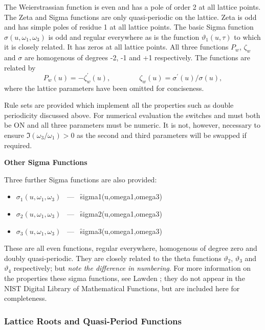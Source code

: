 The Weierstrassian function is even and has a pole of order 2 at all lattice points.
The Zeta and Sigma functions are only quasi-periodic on the lattice. Zeta is odd and has simple poles of residue
1 at all lattice points. The basic Sigma function $\sigma(u,\omega_1,\omega_3)$ is odd and regular everywhere as is
the function $\vartheta_1(u,\tau)$ to which it is closely related. It has zeros at all lattice points. All three functions
$P_w$, $\zeta_w$ and $\sigma$ are homogenous of degrees -2, -1 and +1 respectively. The functions are related by
\[ P_w(u) = -\zeta_w^\prime(u),\qquad\qquad \zeta_w(u) = \sigma^\prime(u)/\sigma(u),\]
where the lattice parameters have been omitted for conciseness.

Rule sets are provided which implement all the properties such as double periodicity discussed above. For numerical evaluation
the switches  and  must both be ON and all three parameters must be numeric. It is not, however,
necessary to ensure $\Im(\omega_3/\omega_1) >0$ as the second and third parameters will be swapped if required.

\textbf{Other Sigma Functions}
\hypertarget{SIGMA1}{}
\hypertarget{SIGMA2}{}
\hypertarget{SIGMA3}{}

Three further Sigma functions are also provided:
  
\begin{itemize}
\item $\sigma_1(u, \omega_1, \omega_3)$ \ --- \ \f{sigma1(u,omega1,omega3)}
\item $\sigma_2(u, \omega_1, \omega_3)$ \ --- \ \f{sigma2(u,omega1,omega3)}
\item $\sigma_3(u, \omega_1, \omega_3)$ \ --- \ \f{sigma3(u,omega1,omega3)}
\end{itemize}
These are all even functions, regular everywhere, homogenous of degree zero and doubly quasi-periodic. They are closely related to the
theta functions $\vartheta_2$, $\vartheta_3$ and $\vartheta_4$ respectively; but \emph{note the difference in numbering}.
For more information on the properties these sigma functions, see Lawden \cite{Lawden:89};
they do not appear in the NIST Digital Library of Mathematical Functions, but are included here for completeness.

\subsubsection{Lattice Roots and Quasi-Period Functions}
\hypertarget{ETA}{}


